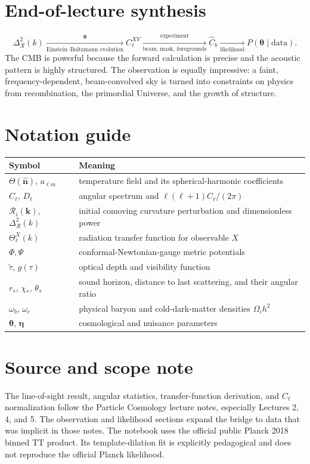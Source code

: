 \documentclass[12pt]{article}
\newcommand{\Rs}{\mathcal R}
\newcommand{\bk}{\mathbf k}
\newcommand{\bn}{\hat{\mathbf n}}
\begin{document}
\section*{End-of-lecture synthesis}
\[
\boxed{
\Delta_{\Rs}^2(k)
\xrightarrow[\text{Einstein--Boltzmann evolution}]{\bm\theta}
C_\ell^{XY}
\xrightarrow[\text{beam, mask, foregrounds}]{\text{experiment}}
\widehat C_b
\xrightarrow[\text{likelihood}]{}
P(\bm\theta\mid\text{data}).}
\]
The CMB is powerful because the forward calculation is precise and the acoustic
pattern is highly structured. The observation is equally impressive: a faint,
frequency-dependent, beam-convolved sky is turned into constraints on physics from
recombination, the primordial Universe, and the growth of structure.

\section*{Notation guide}
\begin{center}
\begin{tabular}{@{}p{.28\linewidth}p{.63\linewidth}@{}}\toprule
Symbol & Meaning\\ \midrule
$\Theta(\bn)$, $a_{\ell m}$ & temperature field and its spherical-harmonic coefficients\\
$C_\ell$, $D_\ell$ & angular spectrum and $\ell(\ell+1)C_\ell/(2\pi)$\\
$\Rs_i(\bk)$, $\Delta_{\Rs}^2(k)$ & initial comoving curvature perturbation and dimensionless power\\
$\Theta_\ell^X(k)$ & radiation transfer function for observable $X$\\
$\Phi,\Psi$ & conformal-Newtonian-gauge metric potentials\\
$\tilde\tau$, $g(\tau)$ & optical depth and visibility function\\
$r_s$, $\chi_*$, $\theta_s$ & sound horizon, distance to last scattering, and their angular ratio\\
$\omega_b$, $\omega_c$ & physical baryon and cold-dark-matter densities $\Omega_i h^2$\\
$\bm\theta$, $\bm\eta$ & cosmological and nuisance parameters\\ \bottomrule
\end{tabular}
\end{center}

\section*{Source and scope note}
The line-of-sight result, angular statistics, transfer-function derivation, and
$C_\ell$ normalization follow the Particle Cosmology lecture notes, especially
Lectures 2, 4, and 5. The observation and likelihood sections expand the bridge to
data that was implicit in those notes. The notebook uses the official public Planck
2018 binned TT product. Its template-dilation fit is explicitly pedagogical and does
not reproduce the official Planck likelihood.
\end{document}

